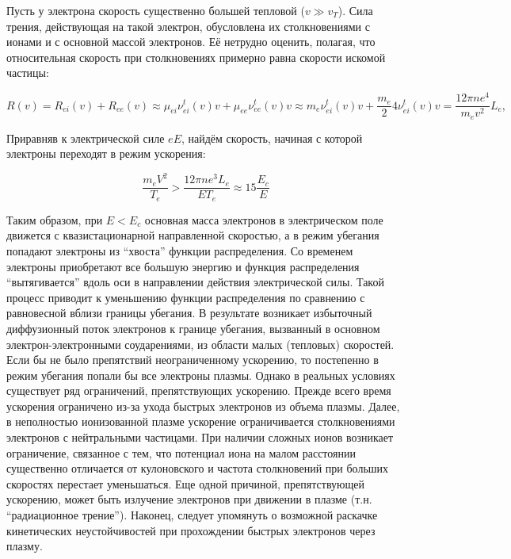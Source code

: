 \documentclass[10pt, a4paper]{article}
\begin{document}
Пусть у электрона скорость существенно большей тепловой ($v\gg v_T$). Сила трения, действующая на такой электрон, обусловлена их столкновениями с ионами и с основной массой электронов. Её нетрудно оценить, полагая, что относительная скорость при столкновениях примерно равна скорости искомой частицы:

\begin{equation*}
	R(v) = R_{ei}(v)+R_{ee}(v)\approx\mu_{ei}\nu_{ei}^t(v)v + \mu_{ee}\nu_{ee}^t(v)v \approx m_e\nu_{ei}^t(v)v + \frac{m_e}{2}4\nu_{ei}^t(v)v=\frac{12\pi n e^4}{m_ev^2}L_e,
\end{equation*}

Приравняв к электрической силе $eE$, найдём скорость, начиная с которой электроны переходят в режим ускорения:

\begin{equation*}
	\frac{m_eV^2}{T_e}>\frac{12\pi n e^3 L_e}{E T_e}\approx 15\frac{E_c}{E}
\end{equation*}

Таким образом, при $E<E_c$ основная масса электронов в электрическом поле движется с квазистационарной направленной скоростью, а в режим убегания попадают электроны из ``хвоста'' функции распределения. Со временем электроны приобретают все большую энергию и функция распределения ``вытягивается'' вдоль оси в направлении действия электрической силы. Такой процесс приводит к уменьшению функции распределения по сравнению с равновесной вблизи границы убегания. В результате возникает избыточный диффузионный поток электронов к границе убегания, вызванный в основном электрон-электронными соударениями, из области малых (тепловых) скоростей. Если бы не было препятствий неограниченному ускорению, то постепенно в режим убегания попали бы все электроны плазмы. Однако в реальных условиях существует ряд ограничений, препятствующих ускорению. Прежде всего время ускорения ограничено из-за ухода быстрых электронов из объема плазмы. Далее, в неполностью ионизованной плазме ускорение ограничивается столкновениями электронов с нейтральными частицами. При наличии сложных ионов возникает ограничение, связанное с тем, что потенциал иона на малом расстоянии существенно отличается от кулоновского и частота столкновений при больших скоростях перестает уменьшаться. Еще одной причиной, препятствующей ускорению, может быть излучение электронов при движении в плазме (т.н. ``радиационное трение''). Наконец, следует упомянуть о возможной раскачке кинетических неустойчивостей при прохождении быстрых электронов через плазму.
\end{document}
